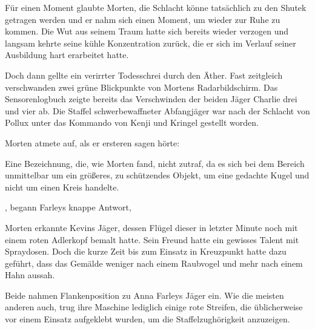 \par

Für einen Moment glaubte Morten, die Schlacht könne tatsächlich zu den Shutek getragen werden und er nahm sich einen Moment, um wieder zur Ruhe zu kommen. Die Wut aus seinem Traum hatte sich bereits wieder verzogen und langsam kehrte seine kühle Konzentration zurück, die er sich im Verlauf seiner Ausbildung hart erarbeitet hatte.

\par

Doch dann gellte ein verirrter Todesschrei durch den Äther. Fast zeitgleich verschwanden zwei grüne Blickpunkte von Mortens Radarbildschirm. Das Sensorenlogbuch zeigte bereits das Verschwinden der beiden Jäger Charlie drei und vier ab. Die Staffel schwerbewaffneter Abfangjäger war nach der Schlacht von Pollux unter das Kommando von Kenji und Kringel gestellt worden.

\par

Morten atmete auf, als er ersteren sagen hörte: 

\par

Eine Bezeichnung, die, wie Morten fand, nicht zutraf, da es sich bei dem Bereich unmittelbar um ein größeres, zu schützendes Objekt, um eine gedachte Kugel und nicht um einen Kreis handelte.

\par

, begann Farleys knappe Antwort, 

\par

Morten erkannte Kevins Jäger, dessen Flügel dieser in letzter Minute noch mit einem roten Adlerkopf bemalt hatte. Sein Freund hatte ein gewisses Talent mit Spraydosen. Doch die kurze Zeit bis zum Einsatz in Kreuzpunkt hatte dazu geführt, dass das Gemälde weniger nach einem Raubvogel und mehr nach einem Hahn aussah.

\par

Beide nahmen Flankenposition zu Anna Farleys Jäger ein. Wie die meisten anderen auch, trug ihre Maschine lediglich einige rote Streifen, die üblicherweise vor einem Einsatz aufgeklebt wurden, um die Staffelzughörigkeit anzuzeigen.

